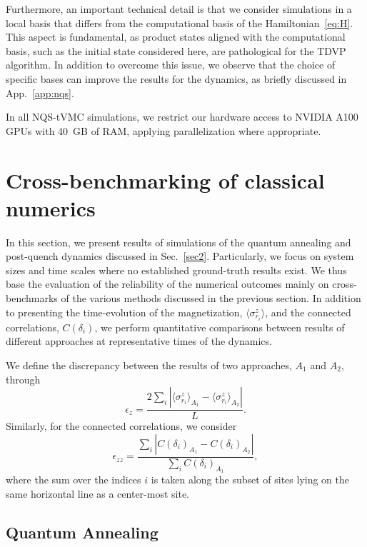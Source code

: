 \documentclass[aps,pra,reprint,amssymb,superscriptaddress]{revtex4-2}
\begin{document}
Furthermore, an important technical detail is that we consider simulations in a local basis that differs from the computational basis of the Hamiltonian~\eqref{eq:H}.  
This aspect is fundamental, as product states aligned with the computational basis, such as the initial state considered here, are pathological for the TDVP algorithm.
In addition to overcome this issue, we observe that the choice of specific bases can improve the results for the dynamics, as briefly discussed in App.~\ref{app:nqs}.

In all NQS-tVMC simulations, we restrict our hardware access to NVIDIA A100 GPUs with 40~GB of RAM, applying parallelization where appropriate.


\section{ \label{sec4} Cross-benchmarking of classical numerics}

In this section, we present results of simulations of the quantum annealing and post-quench dynamics discussed in Sec.~\ref{sec2}. Particularly, we focus on system sizes and time scales where no established ground-truth results exist. We thus base the evaluation of the reliability of the numerical outcomes mainly on cross-benchmarks of the various methods discussed in the previous section. In addition to presenting the time-evolution of the magnetization, $\langle \sigma_{r_i}^z \rangle$, and the connected correlations, $C(\delta_i)$, we perform quantitative comparisons between results of different approaches at representative times of the dynamics. 

We define the discrepancy between the results of two approaches, $A_1$ and $A_2$, through
\begin{equation}
\epsilon_{z} = \frac{ 2 \sum_i \left| \langle \sigma_{r_i}^z \rangle_{A_1} - \langle \sigma_{r_i}^z \rangle_{A_2} \right|}{L}.
\end{equation}
Similarly, for the connected correlations, we consider
\begin{equation}
\epsilon_{zz} =  \frac{\sum_{i} \left| C(\delta_i)_{A_1} - C(\delta_i)_{A_2} \right|}{\sum_{i} C(\delta_i)_{A_1}}  ,
\end{equation}
where the sum over the indices $i$ is taken along the subset of sites lying on the same horizontal line as a center-most site.


\subsection{Quantum Annealing}
\label{sec4.1}
\end{document}

